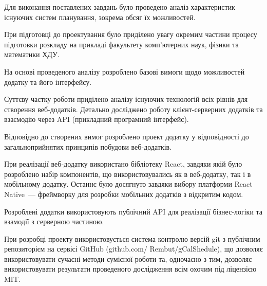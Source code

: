 
Для виконання поставлених завдань було проведено аналіз характеристик існуючих систем планування, зокрема обсяг їх можливостей.

При підготовці до проектування було приділено увагу окремим частини процесу підготовки розкладу на прикладі факультету комп’ютерних наук, фізики та математики ХДУ.

На основі проведеного аналізу розроблено базові вимоги щодо можливостей додатку та його інтерфейсу.

Суттєву частку роботи приділено аналізу існуючих технологій всіх рівнів для створення веб-додатків. Детально досліджено роботу клієнт-серверних додатків та взаємодію через API (прикладний програмний інтерфейс). 

Відповідно до створених вимог розроблено проект додатку у відповідності до загальноприйнятих принципів побудови веб-додатків.

При реалізації веб-додатку використано бібліотеку React, завдяки якій було розроблено набір компонентів, що використовувались як в веб-додатку, так і в мобільному додатку. Останнє було досягнуто завдяки вибору платформи React Native~--- фреймворку для розробки мобільних додатків з відкритим кодом.

Розроблені додатки використовують публічний API для реалізації бізнес-логіки та взамодії з серверною частиною.

При розробці проекту використовується система контролю версій git з публічним репозиторієм на сервісі GitHub (github.com/ Rembut/gCalShedule), що дозволяє використовувати сучасні методи сумісної роботи та, одночасно з тим, дозволяє використовувати результати проведеного дослідження всім охочим під ліцензією MIT.
